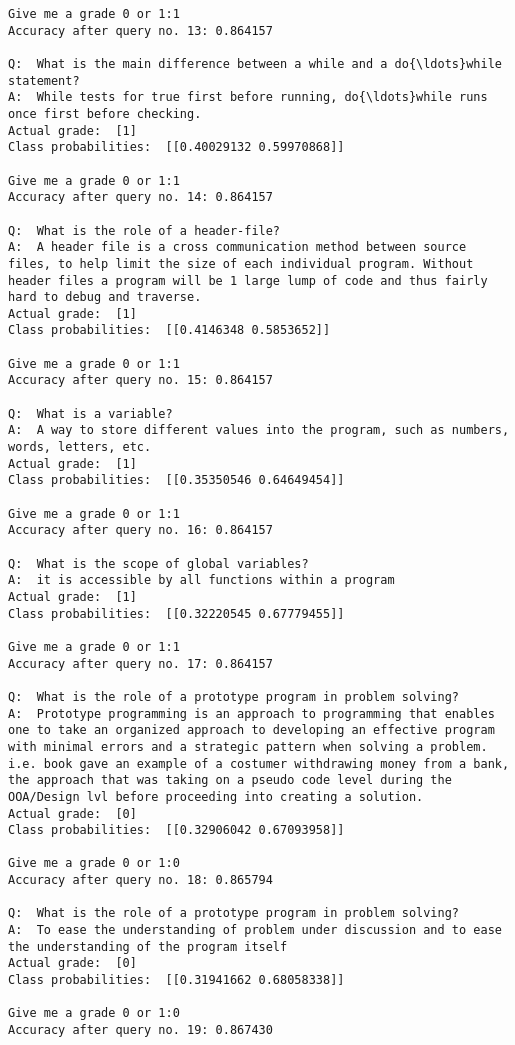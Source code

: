 \documentclass[11pt]{article}
\begin{document}
\begin{Verbatim}[commandchars=\\\{\}]
Give me a grade 0 or 1:1
Accuracy after query no. 13: 0.864157

Q:  What is the main difference between a while and a do{\ldots}while statement?
A:  While tests for true first before running, do{\ldots}while runs once first before checking.
Actual grade:  [1]
Class probabilities:  [[0.40029132 0.59970868]]

Give me a grade 0 or 1:1
Accuracy after query no. 14: 0.864157

Q:  What is the role of a header-file?
A:  A header file is a cross communication method between source files, to help limit the size of each individual program. Without header files a program will be 1 large lump of code and thus fairly hard to debug and traverse.
Actual grade:  [1]
Class probabilities:  [[0.4146348 0.5853652]]

Give me a grade 0 or 1:1
Accuracy after query no. 15: 0.864157

Q:  What is a variable?
A:  A way to store different values into the program, such as numbers, words, letters, etc.
Actual grade:  [1]
Class probabilities:  [[0.35350546 0.64649454]]

Give me a grade 0 or 1:1
Accuracy after query no. 16: 0.864157

Q:  What is the scope of global variables?
A:  it is accessible by all functions within a program
Actual grade:  [1]
Class probabilities:  [[0.32220545 0.67779455]]

Give me a grade 0 or 1:1
Accuracy after query no. 17: 0.864157

Q:  What is the role of a prototype program in problem solving?
A:  Prototype programming is an approach to programming that enables one to take an organized approach to developing an effective program with minimal errors and a strategic pattern when solving a problem. i.e. book gave an example of a costumer withdrawing money from a bank, the approach that was taking on a pseudo code level during the OOA/Design lvl before proceeding into creating a solution. 
Actual grade:  [0]
Class probabilities:  [[0.32906042 0.67093958]]

Give me a grade 0 or 1:0
Accuracy after query no. 18: 0.865794

Q:  What is the role of a prototype program in problem solving?
A:  To ease the understanding of problem under discussion and to ease the understanding of the program itself
Actual grade:  [0]
Class probabilities:  [[0.31941662 0.68058338]]

Give me a grade 0 or 1:0
Accuracy after query no. 19: 0.867430


\end{Verbatim}
\end{document}

